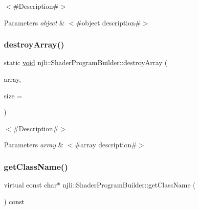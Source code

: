 $<$\#\+Description\#$>$


\begin{DoxyParams}{Parameters}
{\em object} & $<$\#object description\#$>$ \\
\hline
\end{DoxyParams}
\mbox{\label{classnjli_1_1_shader_program_builder_ab5b9f90e9cfbe7bc84cce9cead9c03a8}} 
\subsubsection{\texorpdfstring{destroy\+Array()}{destroyArray()}}
{\footnotesize\ttfamily static \mbox{\hyperlink{_thread_8h_af1e856da2e658414cb2456cb6f7ebc66}{void}} njli\+::\+Shader\+Program\+Builder\+::destroy\+Array (\begin{DoxyParamCaption}\item[{\mbox{\hyperlink{classnjli_1_1_shader_program_builder}{Shader\+Program\+Builder}} $\ast$$\ast$}]{array,  }\item[{const \mbox{\hyperlink{_util_8h_a10e94b422ef0c20dcdec20d31a1f5049}{u32}}}]{size = {} }\end{DoxyParamCaption})\hspace{0.3cm}{\ttfamily [static]}}

$<$\#\+Description\#$>$


\begin{DoxyParams}{Parameters}
{\em array} & $<$\#array description\#$>$ \\
\hline
\end{DoxyParams}
\mbox{\label{classnjli_1_1_shader_program_builder_a131e91d141b0223cedebc6171de59b9b}} 
\subsubsection{\texorpdfstring{get\+Class\+Name()}{getClassName()}}
{\footnotesize\ttfamily virtual const char$\ast$ njli\+::\+Shader\+Program\+Builder\+::get\+Class\+Name (\begin{DoxyParamCaption}{ }\end{DoxyParamCaption}) const\hspace{0.3cm}{\ttfamily [virtual]}}

